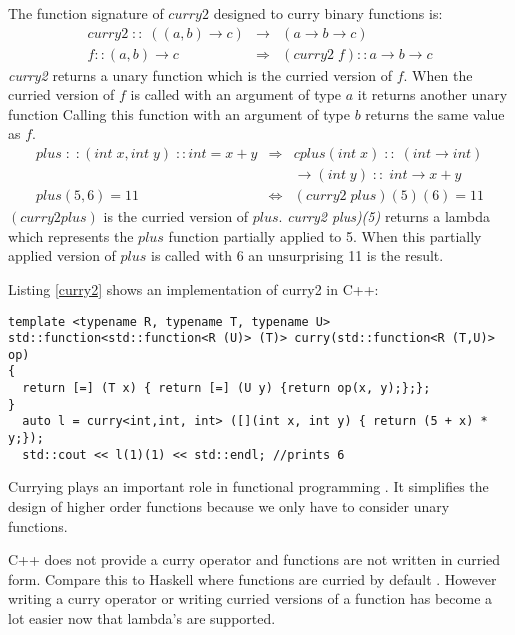 \documentclass[12pt,fleqn]{article}
\begin{document}
The function signature of $curry2$ designed to curry binary functions is:
\begin{eqnarray*}
curry2 \; :: \; ((a,b) \rightarrow c) &\rightarrow& (a \rightarrow b \rightarrow c) \\
f::(a,b) \rightarrow c &\Rightarrow&  (curry2\;f)::a \rightarrow b \rightarrow c 
\end{eqnarray*}
{\em curry2} returns a unary function which is the curried version of $f$.
When the curried version of $f$ is called with an argument of type $a$ it returns another unary function 
Calling this function with an argument of type $b$ returns the same value as $f$.
\begin{eqnarray*}
plus\;:\;:(int \;x, int \;y) \;::int = x+y &\Rightarrow& cplus(int\; x) \;::\; (int \rightarrow int)  \\
                                                             & & \rightarrow (int \; y) \;::\; int \rightarrow x+y  \\
plus(5,6) = 11 &\Leftrightarrow&(curry2 \; plus)(5)(6) = 11
\end{eqnarray*}
$(curry2 plus)$ is the curried version of $plus$.
{\em curry2 plus)(5)} returns a lambda which represents the $plus$ function partially applied to 5. 
When this partially applied version of $plus$ is called with 6 an unsurprising 11 is the result.

Listing \ref{curry2} shows an implementation of curry2 in C++: 
\begin{lstlisting}[caption=curry for binary operators, label=curry2]
template <typename R, typename T, typename U>
std::function<std::function<R (U)> (T)> curry(std::function<R (T,U)> op)
{
  return [=] (T x) { return [=] (U y) {return op(x, y);};};
}
  auto l = curry<int,int, int> ([](int x, int y) { return (5 + x) * y;});
  std::cout << l(1)(1) << std::endl; //prints 6
\end{lstlisting}
Currying plays an important role in functional programming \cite{field}. 
It simplifies the design of higher order functions because we only have to consider unary functions.

C++ does not provide a curry operator and functions are not written in curried form. 
Compare this to Haskell where functions are curried by default \cite{lipovaca, hutton}.
However writing a curry operator or writing curried versions of a function has become a lot easier now that lambda's are supported.

 
%
\end{document}

